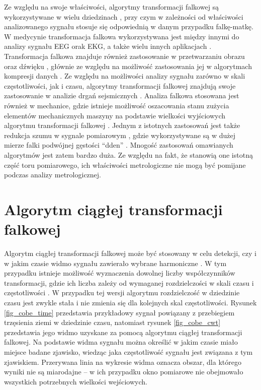 Ze względu na swoje właściwości, algorytmy transformacji falkowej są wykorzystywane w wielu dziedzinach \cite{akujuobi_applications}, przy czym w zależności od właściwości analizowanego sygnału stosuje się odpowiednią w danym przypadku falkę-matkę. W medycynie transformacja falkowa wykorzystywana jest między innymi do analizy sygnału EEG \cite{ocak_medicine} orak EKG, a także wielu innych aplikacjach \cite{unser_medicine}. Transformacja falkowa znajduje również zastosowanie w przetwarzaniu obrazu oraz dźwięku \cite{kotteri_imagecomp}, głównie ze względu na możliwość zastosowania jej w algorytmach kompresji danych \cite{reddy_compression}. Ze względu na możliwości analizy sygnału zarówno w skali częstotliwości, jak i czasu, algorytmy transformacji falkowej znajdują swoje zastosowanie w analizie drgań sejsmicznych \cite{anping_seismic}. Analiza falkowa stosowana jest również w mechanice, gdzie istnieje możliwość oszacowania stanu zużycia elementów mechanicznych maszyny na podstawie wielkości wyjściowych algorytmu transformacji falkowej \cite{yan_mechanics}. Jednym z istotnych zastosowań jest także redukcja szumu w sygnale pomiarowym \cite{auth_denoise}, gdzie wykorzystywane są w dużej mierze falki podwójnej gęstości \enquote{dden} \cite{vimala_ddendenoise}. Mnogość zastosowań omawianych algorytmów jest zatem bardzo duża. Ze względu na fakt, że stanowią one istotną część toru pomiarowego, ich właściwości metrologiczne nie mogą być pomijane podczas analizy metrologicznej.

\section{Algorytm ciągłej transformacji falkowej}

Algorytm ciągłej transformacji falkowej może być stosowany w celu detekcji, czy i w jakim czasie widmo sygnału zawierało wybrane harmoniczne \cite{anping_seismic}. W tym przypadku istnieje możliwość wyznaczenia dowolnej liczby współczynników transformacji, gdzie ich liczba zależy od wymaganej rozdzielczości w skali czasu i częstotliwości \cite{wallen_handbook}. W przypadku tej wersji algorytmu rozdzielczość w dziedzinie czasu jest zwykle stała i nie zmienia się dla kolejnych skal częstotliwości. Rysunek \ref{fig_cobe_time} przedstawia przykładowy sygnał powiązany z przebiegiem trzęsienia ziemi w dziedzinie czasu, natomiast rysunek \ref{fig_cobe_cwt} przedstawia jego widmo uzyskane za pomocą algorytmu ciągłej transformacji falkowej. Na podstawie widma sygnału można określić w jakim czasie miało miejsce badane zjawisko, wiedząc jaka częstotliwość sygnału jest związana z tym zjawiskiem. Przerywana linia na wykresie widma oznacza obszar, dla którego wyniki nie są miarodajne -- w ich przypadku okno pomiarowe nie obejmowało wszystkich potrzebnych wielkości wejściowych.

